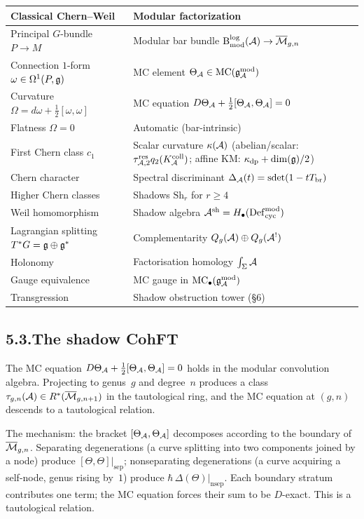 \begin{center}
\renewcommand{\arraystretch}{1.25}
\begin{tabular}{ll}
\textbf{Classical Chern--Weil}
 & \textbf{Modular factorization}\\
\hline
Principal $G$-bundle $P\to M$
 & Modular bar bundle
 $\mathrm{B}^{\log}_{\mathrm{mod}}(\mathcal{A})\to\overline{\mathcal{M}}_{g,n}$\\[2pt]
Connection $1$-form $\omega\in\Omega^1(P,\mathfrak{g})$
 & MC element $\Theta_{\mathcal{A}}\in\mathrm{MC}(\mathfrak{g}_{\mathcal{A}}^{\mathrm{mod}})$\\[2pt]
Curvature $\Omega=d\omega+\frac{1}{2}[\omega,\omega]$
 & MC equation $D\Theta_{\mathcal{A}}+\tfrac12[\Theta_{\mathcal{A}},\Theta_{\mathcal{A}}]=0$\\[2pt]
Flatness $\Omega=0$
 & Automatic (bar-intrinsic)\\[2pt]
First Chern class $c_1$
 & Scalar curvature $\kappa(\mathcal{A})$ (abelian/scalar:
 $\tau_{\mathcal{A},2}^{\mathrm{res}}q_2(K_{\mathcal{A}}^{\mathrm{coll}})$; affine KM:
 $\kappa_{\mathrm{dp}}+\dim(\mathfrak{g})/2$)\\[2pt]
Chern character
 & Spectral discriminant
 $\Delta_{\mathcal{A}}(t)=\operatorname{sdet}(1-tT_{\mathrm{br}})$\\[2pt]
Higher Chern classes
 & Shadows $\mathrm{Sh}_r$ for $r\ge 4$\\[2pt]
Weil homomorphism
 & Shadow algebra
 $\mathcal{A}^{\mathrm{sh}}=H_\bullet(\mathrm{Def}_{\mathrm{cyc}}^{\mathrm{mod}})$\\[2pt]
Lagrangian splitting $T^*G=\mathfrak{g}\oplus\mathfrak{g}^*$
 & Complementarity $Q_g(\mathcal{A})\oplus Q_g(\mathcal{A}^!)$\\[2pt]
Holonomy
 & Factorisation homology $\int_\Sigma\mathcal{A}$\\[2pt]
Gauge equivalence
 & MC gauge in
 $\mathrm{MC}_\bullet(\mathfrak{g}_{\mathcal{A}}^{\mathrm{mod}})$\\[2pt]
Transgression
 & Shadow obstruction tower (\S6)
\end{tabular}
\end{center}

\subsection*{5.3.\enspace The shadow CohFT}

The MC equation
$D\Theta_{\mathcal{A}}+\tfrac{1}{2}[\Theta_{\mathcal{A}},\Theta_{\mathcal{A}}]=0$ holds in
the modular convolution algebra. Projecting to genus~$g$ and
degree~$n$ produces a class
$\tau_{g,n}(\mathcal{A})\in R^*(\overline{\mathcal{M}}_{g,n+1})$ in the
tautological ring, and the MC equation at $(g,n)$ descends to
a tautological relation.

The mechanism: the bracket $[\Theta_{\mathcal{A}},\Theta_{\mathcal{A}}]$
decomposes according to the boundary of
$\overline{\mathcal{M}}_{g,n}$. Separating degenerations (a curve
splitting into two components joined by a node) produce
$[\Theta,\Theta]|_{\mathrm{sep}}$; nonseparating degenerations
(a curve acquiring a self-node, genus rising by~$1$) produce
$\hbar\,\Delta(\Theta)|_{\mathrm{nsep}}$. Each boundary
stratum contributes one term; the MC equation forces their sum
to be $D$-exact. This is a tautological relation.


